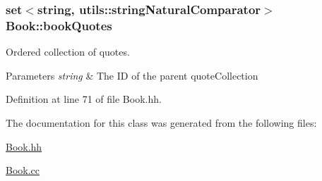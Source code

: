 \subsubsection[{\texorpdfstring{book\+Quotes}{bookQuotes}}]{\setlength{\rightskip}{0pt plus 5cm}set$<$string, {\bf utils\+::string\+Natural\+Comparator}$>$ Book\+::book\+Quotes\hspace{0.3cm}{\ttfamily [private]}}\hypertarget{class_book_ae68f8cb5ab781aa3dad4f5ed90b3057e}{}\label{class_book_ae68f8cb5ab781aa3dad4f5ed90b3057e}


Ordered collection of quotes. 


\begin{DoxyParams}{Parameters}
{\em string} & The ID of the parent quote\+Collection \\
\hline
\end{DoxyParams}


Definition at line 71 of file Book.\+hh.



The documentation for this class was generated from the following files\+:\begin{DoxyCompactItemize}
\item 
\hyperlink{_book_8hh}{Book.\+hh}\item 
\hyperlink{_book_8cc}{Book.\+cc}\end{DoxyCompactItemize}
